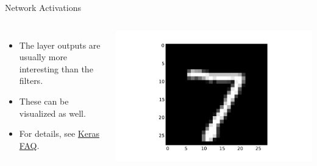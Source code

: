 \documentclass[10pt, aspectratio=169]{beamer} %
\begin{document}
\begin{frame}[fragile]{Network Activations}
\begin{columns}
\begin{itemize}
	\item The layer outputs are usually more interesting than the filters.
	\item These can be visualized as well.
	\item For details, see \href{http://keras.io/faq/#how-can-i-visualize-the-output-of-an-intermediate-layer}{Keras FAQ}.
	\end{itemize}
\includegraphics[width=\textwidth]{keras_l1_input.pdf}\\

\end{columns}
\end{frame}
\end{document}
